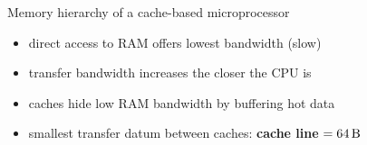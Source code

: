 \documentclass[9pt,xcolor=table]{beamer}
\begin{document}
\begin{frame}
\begin{columns}[c]
\begin{column}{.45\textwidth}
\begin{block}{Memory hierarchy of a cache-based microprocessor}
\begin{itemize}
      \item direct access to RAM offers lowest bandwidth (slow)
      \item transfer bandwidth increases the closer the CPU is
      \item caches hide low RAM bandwidth by buffering hot data
      \item smallest transfer datum between caches:
        \textbf{cache line} $= \unit[64]{B}$
      \end{itemize}
    \end{block}
    \vfill

\end{column}
\end{columns}
\end{frame}
\end{document}

